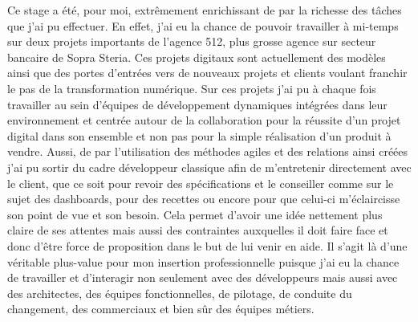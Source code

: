 \newenvironment{changemargin}[2]{%
\begin{list}{}{%
\setlength{\topsep}{0pt}%
\setlength{\leftmargin}{#1}%
\setlength{\rightmargin}{#2}%
\setlength{\listparindent}{\parindent}%
\setlength{\itemindent}{\parindent}%
\setlength{\parsep}{\parskip}%
}%
\item[]}{\end{list}}

\begin{changemargin}{-1cm}{-1cm}

	Ce stage a été, pour moi, extrêmement enrichissant de par la richesse des tâches que j'ai pu effectuer. En effet, j'ai eu la chance de pouvoir travailler à mi-temps sur deux projets importants de l'agence 512, plus grosse agence sur secteur bancaire de Sopra Steria. Ces projets digitaux sont actuellement des modèles ainsi que des portes d'entrées vers de nouveaux projets et clients voulant franchir le pas de la transformation numérique. Sur ces projets j'ai pu à chaque fois travailler au sein d'équipes de développement dynamiques intégrées dans leur environnement et centrée autour de la collaboration pour la réussite d'un projet digital dans son ensemble et non pas pour la simple réalisation d'un produit à vendre. Aussi, de par l'utilisation des méthodes agiles et des relations ainsi créées j'ai pu sortir du cadre développeur classique afin de m'entretenir directement avec le client, que ce soit pour revoir des spécifications et le conseiller comme sur le sujet des dashboards, pour des recettes ou encore pour que celui-ci m'éclaircisse son point de vue et son besoin. Cela permet d'avoir une idée nettement plus claire de ses attentes mais aussi des contraintes auxquelles il doit faire face et donc d'être force de proposition dans le but de lui venir en aide. Il s'agit là d'une véritable plus-value pour mon insertion professionnelle puisque j'ai eu la chance de travailler et d'interagir non seulement avec des développeurs mais aussi avec des architectes, des équipes fonctionnelles, de pilotage, de conduite du changement, des commerciaux et bien sûr des équipes métiers. \\
	

\end{changemargin}
